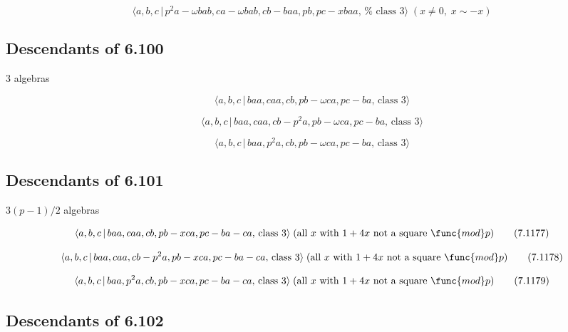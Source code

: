 \documentclass[10pt]{article}
\begin{document}
\begin{equation}
\langle a,b,c\,|\,p^{2}a-\omega bab,ca-\omega bab,cb-baa,pb,pc-xbaa,\,\text{%
class }3\rangle \;(x\neq 0,\;x\sim -x)  \tag{7.1173}
\end{equation}

\subsection{Descendants of 6.100}

3 algebras

\begin{equation}
\langle a,b,c\,|\,baa,caa,cb,pb-\omega ca,pc-ba,\,\text{class }3\rangle 
\tag{7.1174}
\end{equation}

\begin{equation}
\langle a,b,c\,|\,baa,caa,cb-p^{2}a,pb-\omega ca,pc-ba,\,\text{class }%
3\rangle  \tag{7.1175}
\end{equation}

\begin{equation}
\langle a,b,c\,|\,baa,p^{2}a,cb,pb-\omega ca,pc-ba,\,\text{class }3\rangle 
\tag{7.1176}
\end{equation}

\subsection{Descendants of 6.101}

$3(p-1)/2$ algebras

\begin{equation}
\langle a,b,c\,|\,baa,caa,cb,pb-xca,pc-ba-ca,\,\text{class }3\rangle \;(%
\text{all }x\text{ with }1+4x\text{ not a square }\func{mod}p)  \tag{7.1177}
\end{equation}

\begin{equation}
\langle a,b,c\,|\,baa,caa,cb-p^{2}a,pb-xca,pc-ba-ca,\,\text{class }3\rangle
\;(\text{all }x\text{ with }1+4x\text{ not a square }\func{mod}p) 
\tag{7.1178}
\end{equation}

\begin{equation}
\langle a,b,c\,|\,baa,p^{2}a,cb,pb-xca,pc-ba-ca,\,\text{class }3\rangle \;(%
\text{all }x\text{ with }1+4x\text{ not a square }\func{mod}p)  \tag{7.1179}
\end{equation}

\subsection{Descendants of 6.102}
\end{document}
